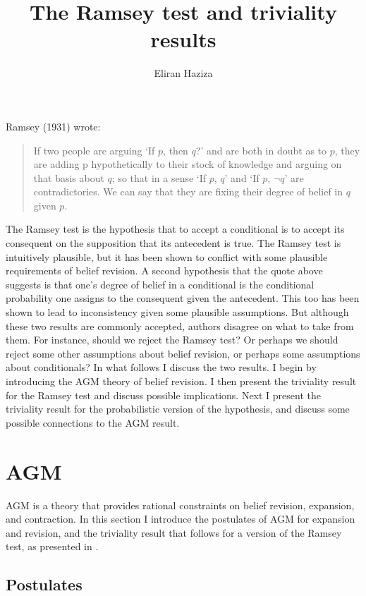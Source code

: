 \documentclass[12pt]{article}
\begin{document}
 
\title{The Ramsey test and triviality results}
\author{Eliran Haziza}
\maketitle

Ramsey (1931) wrote:

\begin{quote}
If two people are arguing `If $p$, then $q$?' and are both in doubt as to $p$, they are adding p hypothetically to their stock of knowledge and arguing on that basis about $q$; so that in a sense `If $p$, $q$' and `If $p$, $\neg q$' are contradictories. We can say that they are fixing their degree of belief in $q$ given $p$.
\end{quote}

The Ramsey test is the hypothesis that to accept a conditional is to accept its consequent on the supposition that its antecedent is true. The Ramsey test is intuitively plausible, but it has been shown to conflict with some plausible requirements of belief revision. A second hypothesis that the quote above suggests is that one's degree of belief in a conditional is the conditional probability one assigns to the consequent given the antecedent. This too has been shown to lead to inconsistency given some plausible assumptions. But although these two results are commonly accepted, authors disagree on what to take from them. For instance, should we reject the Ramsey test? Or perhaps we should reject some other assumptions about belief revision, or perhaps some assumptions about conditionals? In what follows I discuss the two results. I begin by introducing the AGM theory of belief revision. I then present the triviality result for the Ramsey test and discuss possible implications. Next I present the triviality result for the probabilistic version of the hypothesis, and discuss some possible connections to the AGM result.

\section{AGM}

AGM is a theory that provides rational constraints on belief revision, expansion, and contraction. In this section I introduce the postulates of AGM for expansion and revision, and the triviality result that follows for a version of the Ramsey test, as presented in \gff{}.

\subsection{Postulates}
\end{document}
